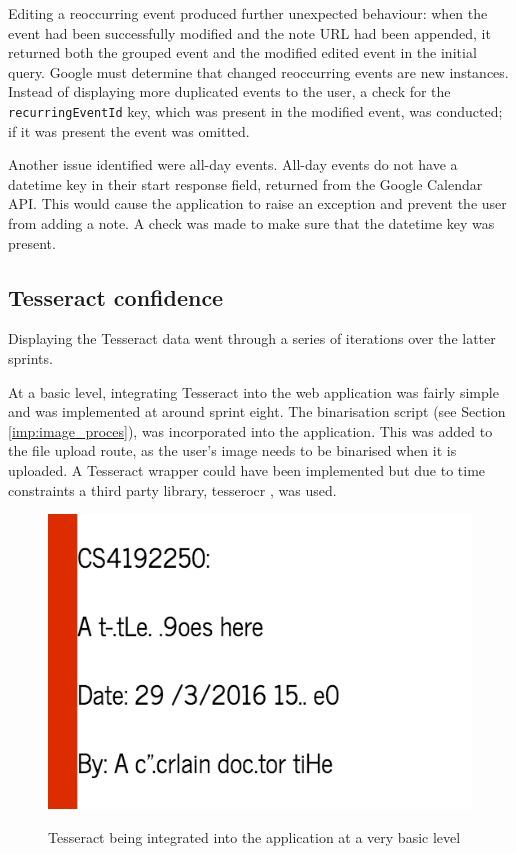{{{{{{{Editing a reoccurring event produced further unexpected behaviour: when the event had been successfully modified and the note URL had been appended, it returned both the grouped event and the modified edited event in the initial query. Google must determine that changed reoccurring events are new instances. Instead of displaying more duplicated events to the user, a check for the \texttt{recurringEventId} key, which was present in the modified event, was conducted; if it was present the event was omitted.

Another issue identified were all-day events. All-day events do not have a datetime key in their start response field, returned from the Google Calendar API. This would cause the application to raise an exception and prevent the user from adding a note. A check was made to make sure that the datetime key was present.

\subsection{Tesseract confidence}
Displaying the Tesseract data went through a series of iterations over the latter sprints.

At a basic level, integrating Tesseract into the web application was fairly simple and was implemented at around sprint eight. The binarisation script (see Section \ref{imp:image_proces}), was incorporated into the application. This was added to the file upload route, as the user's image needs to be binarised when it is uploaded. A Tesseract wrapper could have been implemented but due to time constraints a third party library, tesserocr \cite{citeulike:14021437}, was used.

\begin{figure}[H]
  \centering
  \includegraphics[scale=0.7]{images/tesseract_first}
  \label{fig:tesseract_output}
  \caption{Tesseract being integrated into the application at a very basic level}
\end{figure}

}}}}}}}
